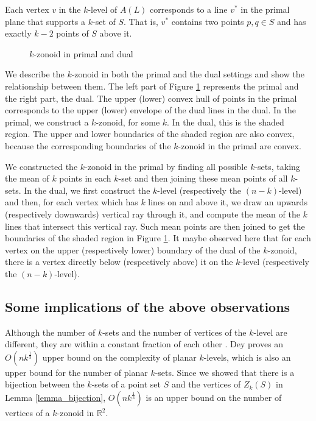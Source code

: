 \documentclass[charterfonts,lotsofwhite]{patmorin}
\begin{document}
Each vertex $v$ in the $k$-level of $A(L)$ corresponds to a line $v^*$
in the primal plane that supports a $k$-set of $S$.  That is, $v^*$
contains two points $p, q\in S$ and has exactly $k-2$ points of $S$
above it.

\begin{figure}[h]
 \begin{center} 
   \caption{\label{fig_primal_dual}$k$-zonoid in primal and dual}
 \end{center}
\end{figure}

We describe the $k$-zonoid in both the primal and the dual settings
and show the relationship between them. The left part of Figure
\ref{fig_primal_dual} represents the primal and the right part, the
dual. The upper (lower) convex hull of points in the primal
corresponds to the upper (lower) envelope of the dual lines in the
dual. In the primal, we construct a $k$-zonoid, for some $k$. In the
dual, this is the shaded region. The upper and lower boundaries of the
shaded region are also convex, because the corresponding boundaries of
the $k$-zonoid in the primal are convex. 

We constructed the $k$-zonoid in the primal by finding all possible
$k$-sets, taking the mean of $k$ points in each $k$-set and then
joining these mean points of all $k$-sets. In the dual, we first
construct the $k$-level (respectively the $(n-k)$-level) and then, for
each vertex which has $k$ lines on and above it, we draw an upwards
(respectively downwards) vertical ray through it, and compute the mean
of the $k$ lines that intersect this vertical ray. Such mean points
are then joined to get the boundaries of the shaded region in Figure
\ref{fig_primal_dual}. It maybe observed here that for each vertex on
the upper (respectively lower) boundary of the dual of the $k$-zonoid,
there is a vertex directly below (respectively above) it on the
$k$-level (respectively the $(n-k)$-level). 

\subsection{Some implications of the above observations}\label{subsection_some_implications_of_the_above_observations}

Although the number of $k$-sets and the number of vertices of the
$k$-level are different, they are within a constant fraction of each
other \cite{edelsbrunner_book}. Dey
\cite{improved_bounds_on_planar_ksets_and_klevels} proves an
$O(nk^{\frac{1}{3}})$ upper bound on the complexity of planar
$k$-levels, which is also an upper bound for the number of planar
$k$-sets. Since we showed that there is a bijection between the
$k$-sets of a point set $S$ and the vertices of $Z_k(S)$ in Lemma
\ref{lemma_bijection}, $O(nk^{\frac{1}{3}})$ is an upper bound on the
number of vertices of a $k$-zonoid in $\mathbb{R}^2$.
\end{document}
